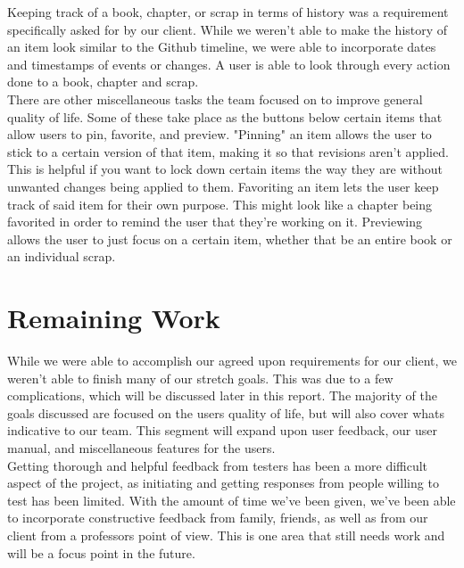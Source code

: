 \documentclass[onecolumn, draftclsnofoot,10pt, compsoc]{IEEEtran}
\begin{document}
\noindent Keeping track of a book, chapter, or scrap in terms of history was a requirement specifically 
asked for by our client. While we weren't able to make the history of an item look similar to the Github
timeline, we were able to incorporate dates and timestamps of events or changes. A user is able to look 
through every action done to a book, chapter and scrap. \\

\noindent There are other miscellaneous tasks the team focused on to improve general quality of life. 
Some of these take place as the buttons below certain items that allow users to pin, favorite, and preview.
"Pinning" an item allows the user to stick to a certain version of that item, making it so that revisions
aren't applied. This is helpful if you want to lock down certain items the way they are without unwanted 
changes being applied to them. Favoriting an item lets the user keep track of said item for their own purpose.
This might look like a chapter being favorited in order to remind the user that they're working on it. 
Previewing allows the user to just focus on a certain item, whether that be an entire book or an individual 
scrap. \\

\noindent

\section{Remaining Work} 

While we were able to accomplish our agreed upon requirements for our client, we weren't able to finish
many of our stretch goals. This was due to a few complications, which will be discussed later in this
report. The majority of the goals discussed are focused on the users quality of life, but will also 
cover whats indicative to our team. This segment will expand upon user feedback, our user manual, and 
miscellaneous features for the users. \\

\noindent Getting thorough and helpful feedback from testers has been a more difficult aspect of the project, as 
initiating and getting responses from people willing to test has been limited. With the amount of time 
we've been given, we've been able to incorporate constructive feedback from family, friends, as well 
as from our client from a professors point of view. This is one area that still needs work and will be
a focus point in the future. \\
\end{document}
